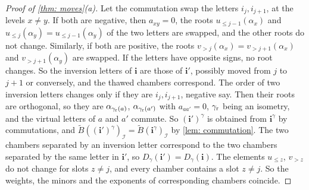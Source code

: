 \documentclass[a4paper]{amsart}
\numberwithin{equation}{section}
\theoremstyle{definition}
\theoremstyle{remark}
\newcommand{\mcI}{\mathcal{I}}
\newcommand{\bfi}{\mathbf{i}}
\newcommand{\tB}{\widetilde{B}}
\newcommand{\rr}{{\rm r}}
\begin{document}
\begin{proof}[Proof of \cref{thm: moves}(a)]
  Let the commutation swap the letters $i_j,i_{j+1}$, at the levels $x\neq y$.
  If both are negative, then $a_{xy}=0$, the roots $u_{\le j-1}(\alpha_x)$ and $u_{\le j}(\alpha_y)=u_{\le j-1}(\alpha_y)$ of the two letters are swapped, and the other roots do not change.
  Similarly, if both are positive, the roots $v_{>j}(\alpha_x)=v_{>j+1}(\alpha_x)$ and $v_{>j+1}(\alpha_y)$ are swapped.
  If the letters have opposite signs, no root changes.
  So the inversion letters of $\bfi$ are those of $\bfi'$, possibly moved from $j$ to $j+1$ or conversely, and the thawed chambers correspond.
  The order of two inversion letters changes only if they are $i_j,i_{j+1}$, negative say.
  Then their roots are orthogonal, so they are $\alpha_{\gamma_{\rr}(a)}$, $\alpha_{\gamma_{\rr}(a')}$ with $a_{aa'}=0$, $\gamma_{\rr}$ being an isometry, and the virtual letters of $a$ and $a'$ commute.
  So $(\bfi')^\gamma$ is obtained from $\bfi^\gamma$ by commutations, and $\tB((\bfi')^\gamma)_\mcI=\tB(\bfi^\gamma)_\mcI$ by \cref{lem: commutation}.
  The two chambers separated by an inversion letter correspond to the two chambers separated by the same letter in $\bfi'$, so $D_\gamma(\bfi')=D_\gamma(\bfi)$.
  The elements $u_{\le z}$, $v_{>z}$ do not change for slots $z\neq j$, and every chamber contains a slot $z\neq j$.
  So the weights, the minors and the exponents of corresponding chambers coincide.
\end{proof}
\end{document}

